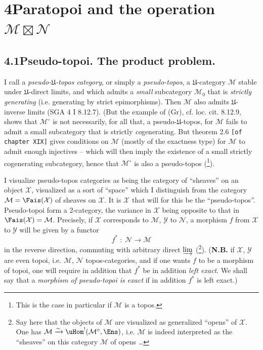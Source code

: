 

\section*{4\quad Paratopoi and the operation $\mathcal{M}\boxtimes\mathcal{N}$}

\subsection*{4.1\quad Pseudo-topoi. The product problem.}

I call a \textit{pseudo-$\mathfrak{U}$-topos category}, or simply a \textit{pseudo-topos}, a $\mathfrak{U}$-category $\mathcal{M}$ stable under $\mathfrak{U}$-direct limits, and which admits a \textit{small} subcategory $\mathcal{M}_0$ that is \textit{strictly generating} (i.e. generating by strict epimorphisms). Then $\mathcal{M}$ also admits $\mathfrak{U}$-inverse limits (SGA 4 I 8.12.7). (But the example of (Gr), cf. loc. cit. 8.12.9, shows that $\mathcal{M}^\circ$ is not necessarily, for all that, a pseudo-$\mathfrak{U}$-topos, for $\mathcal{M}$ fails to admit a small subcategory that is strictly \textit{co}generating. But theorem 2.6 \texttt{[of chapter XIX]} gives conditions on $\mathcal{M}$ (mostly of the exactness type) %
for $\mathcal{M}$ to admit enough injectives -- which will then imply the existence of a small strictly cogenerating subcategory, hence that $\mathcal{M}^\circ$ is also a pseudo-topos (\footnote{This is the case in particular if $\mathcal{M}$ is a topos.}).

I visualize pseudo-topos categories as being the category of ``sheaves'' on an object $\mathcal{X}$, visualized as a sort of ``space'' which I distinguish from the category $\mathcal{M}=\Fais(\mathcal{X})$ of sheaves on $\mathcal{X}$. It is $\mathcal{X}$ that will for this be the ``pseudo-topos''. Pseudo-topoi form a 2-category, the variance in $\mathcal{X}$ being opposite to that in $\Fais(\mathcal{X})=\mathcal{M}$. Precisely, if $\mathcal{X}$ corresponds to $\mathcal{M}$, $\mathcal{Y}$ to $\mathcal{N}$, a morphism $f$ from $\mathcal{X}$ to $\mathcal{Y}$ will be given by a functor
\[
f^* \;:\; \mathcal{N} \longrightarrow \mathcal{M}
\tag*{(4.1.1)}
\]
in the reverse direction, commuting with arbitrary direct $\varinjlim$ (\footnote{Say here that the objects of $\mathcal{M}$ are visualized as generalized ``opens'' of $\mathcal{X}$. One has $\mathcal{M}\xrightarrow{\sim}\uHom^!(\mathcal{M}^\circ,\Ens)$, i.e. $\mathcal{M}$ is indeed interpreted as the ``sheaves'' on this category $\mathcal{M}$ of opens \ldots}). (\textbf{N.B.} if $\mathcal{X}$, $\mathcal{Y}$ are even topoi, i.e. $\mathcal{M}$, $\mathcal{N}$ topos-categories, and if one wants $f$ to be a morphism of topoi, one will require in addition that $f^*$ be in addition \textit{left exact}. We shall say that a \textit{morphism of pseudo-topoi is exact} if in addition $f^*$ is left exact.)

